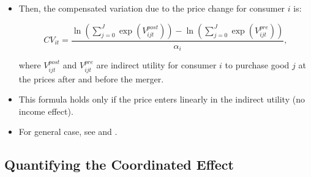 \documentclass[]{book}
\providecommand{\tightlist}{%
  \setlength{\itemsep}{0pt}\setlength{\parskip}{0pt}}
\begin{document}
\begin{itemize}
\tightlist
\item
  Then, the compensated variation due to the price change for consumer
  \(i\) is:

  \begin{equation}
  CV_{it} = \frac{\ln (\sum_{j = 0}^J \exp(V_{ijt}^{post}) ) - \ln (\sum_{j = 0}^J \exp(V_{ijt}^{pre})) }{\alpha_i},
  \end{equation}

  where \(V_{ijt}^{post}\) and \(V_{ijt}^{pre}\) are indirect utility
  for consumer \(i\) to purchase good \(j\) at the prices after and
  before the merger.
\item
  This formula holds only if the price enters linearly in the indirect
  utility (no income effect).
\item
  For general case, see \citet{Small1981} and \citet{Mcfadden1995}.
\end{itemize}

\subsection{Quantifying the Coordinated
Effect}\label{quantifying-the-coordinated-effect}
\end{document}
